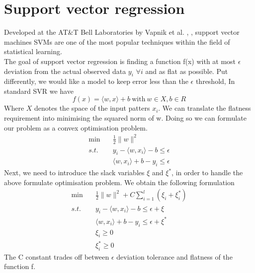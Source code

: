 \section{Support vector regression}
Developed at the AT\&T Bell Laboratories by Vapnik et al. \cite{cortes1995support}, \cite{vapnik1997support}, support vector machines SVMs are one of the most popular techniques within the field of statistical learning.
\\
The goal of support vector regression is finding a function f(x) with at most $\epsilon$ deviation from the actual observed data $y_i$ $\forall i$ and as flat as possible. 
Put differently, we would like a model to keep error less than the $\epsilon$ threshold,  
In standard SVR we have
\begin{equation}
    f(x)=\langle w,x \rangle +b \ \textrm{with} \ w \in X, b \in R
\end{equation}
Where $X$ denotes the space of the input patters $x_i$.
We can translate the flatness requirement into minimising the squared norm of w. Doing so we can formulate our problem as a convex optimisation problem.
\begin{equation}
    \begin{aligned}
        \min \quad& \frac{1}{2}\|w\|^2
        \\
        s.t. \quad& y_i-\langle w, x_i\rangle-b\leq \epsilon
        \\
        \quad& \langle w, x_i\rangle +b-y_i\leq \epsilon
    \end{aligned}
\end{equation}
Next, we need to introduce the slack variables $\xi$ and $\xi^*$, in order to handle the above formulate optimisation problem.
We obtain the following formulation
\begin{equation}
    \begin{aligned}
        \min \quad& \frac{1}{2}\|w\|^2+C\sum\limits_{i=1}^l(\xi_i+\xi_i^*)
        \\
        s.t. \quad& y_i-\langle w, x_i\rangle-b\leq \epsilon+\xi
        \\
        \quad& \langle w, x_i\rangle +b-y_i\leq \epsilon+\xi^*
        \\
        \quad& \xi_i\geq0
        \\
        \quad& \xi_i^*\geq0
    \end{aligned}
\end{equation}
The C constant trades off between $\epsilon$ deviation tolerance and flatness of the function f.
